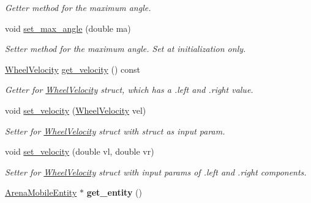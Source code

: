 \begin{DoxyCompactItemize}
\begin{DoxyCompactList}\small\item\em Getter method for the maximum angle. \end{DoxyCompactList}\item 
void \hyperlink{classMotionHandler_aa73973c705626f1f95ac59391f23bcc9}{set\+\_\+max\+\_\+angle} (double ma)\hypertarget{classMotionHandler_aa73973c705626f1f95ac59391f23bcc9}{}\label{classMotionHandler_aa73973c705626f1f95ac59391f23bcc9}

\begin{DoxyCompactList}\small\item\em Setter method for the maximum angle. Set at initialization only. \end{DoxyCompactList}\item 
\hyperlink{structWheelVelocity}{Wheel\+Velocity} \hyperlink{classMotionHandler_a99fe1b248e817556de2b366a2d98c57c}{get\+\_\+velocity} () const \hypertarget{classMotionHandler_a99fe1b248e817556de2b366a2d98c57c}{}\label{classMotionHandler_a99fe1b248e817556de2b366a2d98c57c}

\begin{DoxyCompactList}\small\item\em Getter for \hyperlink{structWheelVelocity}{Wheel\+Velocity} struct, which has a .left and .right value. \end{DoxyCompactList}\item 
void \hyperlink{classMotionHandler_ac4bf67ba783c1afb5a5839229de3f3f9}{set\+\_\+velocity} (\hyperlink{structWheelVelocity}{Wheel\+Velocity} vel)\hypertarget{classMotionHandler_ac4bf67ba783c1afb5a5839229de3f3f9}{}\label{classMotionHandler_ac4bf67ba783c1afb5a5839229de3f3f9}

\begin{DoxyCompactList}\small\item\em Setter for \hyperlink{structWheelVelocity}{Wheel\+Velocity} struct with struct as input param. \end{DoxyCompactList}\item 
void \hyperlink{classMotionHandler_af31975aa667ca20835e4d5bb0216706e}{set\+\_\+velocity} (double vl, double vr)\hypertarget{classMotionHandler_af31975aa667ca20835e4d5bb0216706e}{}\label{classMotionHandler_af31975aa667ca20835e4d5bb0216706e}

\begin{DoxyCompactList}\small\item\em Setter for \hyperlink{structWheelVelocity}{Wheel\+Velocity} struct with input params of .left and .right components. \end{DoxyCompactList}\item 
\hyperlink{classArenaMobileEntity}{Arena\+Mobile\+Entity} $\ast$ {\bfseries get\+\_\+entity} ()\hypertarget{classMotionHandler_ad8472612d15be1ada7f919f45d245adc}{}\label{classMotionHandler_ad8472612d15be1ada7f919f45d245adc}

\end{DoxyCompactItemize}
